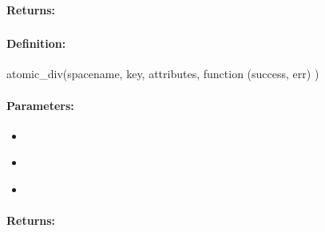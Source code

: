 \paragraph{Returns:}


\pagebreak
\subsubsection{}
\label{api:nodejs:atomic_div}


\paragraph{Definition:}
\begin{javascriptcode}
atomic_div(spacename, key, attributes, function (success, err) {})
\end{javascriptcode}
\paragraph{Parameters:}
\begin{itemize}[noitemsep]
\item {}\\

\item {}\\

\item {}\\

\end{itemize}

\paragraph{Returns:}


\pagebreak
\subsubsection{}
\label{api:nodejs:cond_atomic_div}


